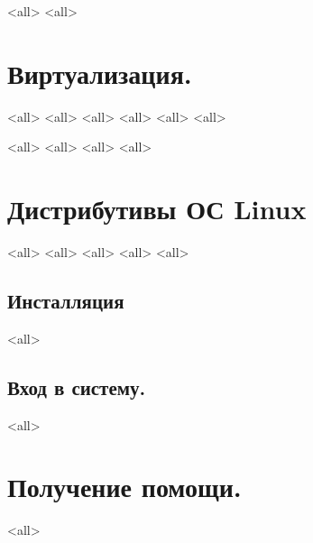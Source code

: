 \mode<all>{}
\mode<all>{}
\section{Виртуализация.}
\mode<all>{}
\mode<all>{}
\mode<all>{}
\mode<all>{}
\mode<all>{}
\mode<all>{}

\mode<all>{}
\mode<all>{}
\mode<all>{}
\mode<all>{}

\section{Дистрибутивы ОС Linux}
\mode<all>{}
\mode<all>{}
\mode<all>{}
\mode<all>{}
\mode<all>{}
\subsection{Инсталляция}
\mode<all>{}

\subsection{Вход в систему.}
\mode<all>{}

\section{Получение помощи.}
\mode<all>{}

\bye
